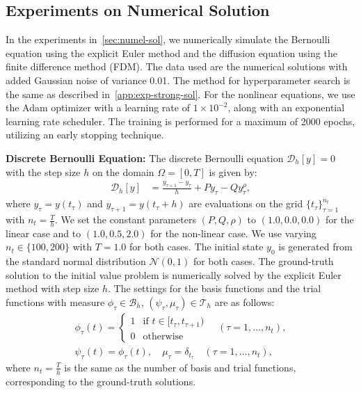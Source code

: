 \documentclass{article}
\theoremstyle{plain}
\theoremstyle{definition}
\theoremstyle{remark}
\begin{document}
\subsection{Experiments on Numerical Solution}
\label{app:exp-numel-sol}
In the experiments in~\cref{sec:numel-sol}, we numerically simulate the Bernoulli equation using the explicit Euler method and the diffusion equation using the finite difference method (FDM). The data used are the numerical solutions with added Gaussian noise of variance 0.01. The method for hyperparameter search is the same as described in~\cref{app:exp-strong-sol}.
For the nonlinear equations, we use the Adam optimizer with a learning rate of \(1 \times 10^{-2}\), along with an exponential learning rate scheduler. The training is performed for a maximum of 2000 epochs, utilizing an early stopping technique.

\textbf{Discrete Bernoulli Equation:}
The discrete Bernoulli equation \(\mathscr{D}_{h}[y]=0\) with the step size \( h \) on the domain \(\Omega = [0, T]\) is given by:
\begin{align*}
    \mathscr{D}_h[y] &= \frac{y_{\tau+1} - y_{\tau}}{h} + Py_{\tau} - Qy_{\tau}^{\rho},
\end{align*}
where \( y_{\tau} = y(t_{\tau}) \) and \( y_{\tau+1} = y(t_{\tau} + h) \) are evaluations on the grid \( \{ t_{\tau} \}_{\tau=1}^{n_t} \) with \( n_t = \tfrac{T}{h} \). 
We set the constant parameters \( (P, Q, \rho) \) to \( (1.0, 0.0, 0.0) \) for the linear case and to \( (1.0, 0.5, 2.0) \) for the non-linear case. We use varying \( n_t \in \{ 100, 200 \} \) with \( T = 1.0 \) for both cases. The initial state \( y_0 \) is generated from the standard normal distribution \(\mathcal{N}(0, 1)\) for both cases.
The ground-truth solution to the initial value problem is numerically solved by the explicit Euler method with step size \( h \).
The settings for the basis functions and the trial functions with measure \(\phi_{\tau} \in \mathcal{B}_h\), \((\psi_{\tau}, \mu_{\tau}) \in \mathcal{T}_h\) are as follows:
\begin{gather*}
    \phi_{\tau}(t) = \begin{cases}
    1 & \text{if } t \in [t_{\tau}, t_{\tau+1}) \\
    0 & \text{otherwise}
    \end{cases} \quad (\tau = 1, \ldots, n_t), \\
    \psi_{\tau}(t) = \phi_{\tau}(t), \quad \mu_{\tau} = \delta_{t_{\tau}} \quad (\tau = 1, \ldots, n_t),
\end{gather*}
where \(n_t = \frac{T}{h} \) is the same as the number of basis and trial functions, corresponding to the ground-truth solutions.
\end{document}
